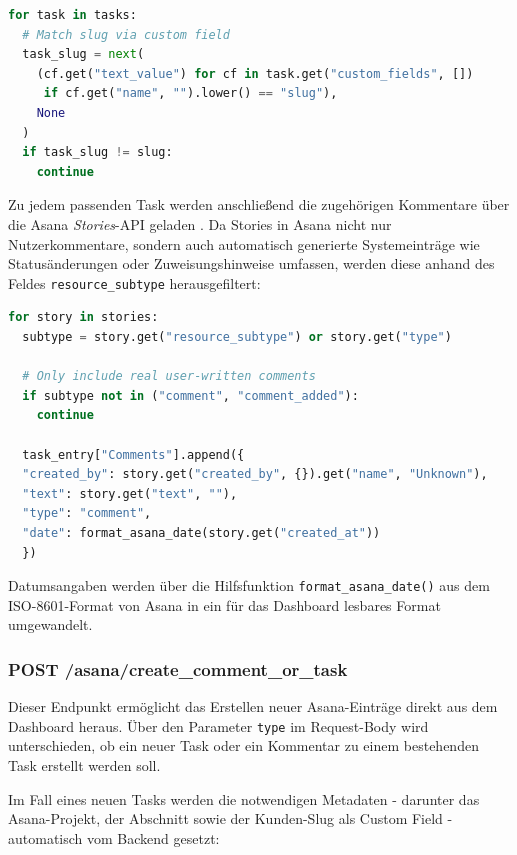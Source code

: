 \begin{lstlisting}[language=Python, caption={Filterung von Asana-Tasks nach Slug}, label={lst:asana-slug-filter}]
for task in tasks:
  # Match slug via custom field
  task_slug = next(
    (cf.get("text_value") for cf in task.get("custom_fields", [])
     if cf.get("name", "").lower() == "slug"),
    None
  )
  if task_slug != slug:
    continue
\end{lstlisting}

Zu jedem passenden Task werden anschließend die zugehörigen Kommentare über die Asana \textit{Stories}-API geladen \cite{asana_stories}. Da Stories in Asana nicht nur Nutzerkommentare, sondern auch automatisch generierte Systemeinträge wie Statusänderungen oder Zuweisungshinweise umfassen, werden diese anhand des Feldes \texttt{resource\_subtype} herausgefiltert:

\begin{lstlisting}[language=Python, caption={Filterung von Nutzerkommentaren aus Asana Stories}, label={lst:asana-stories-filter}]
for story in stories:
  subtype = story.get("resource_subtype") or story.get("type")

  # Only include real user-written comments
  if subtype not in ("comment", "comment_added"):
    continue

  task_entry["Comments"].append({
  "created_by": story.get("created_by", {}).get("name", "Unknown"),
  "text": story.get("text", ""),
  "type": "comment",
  "date": format_asana_date(story.get("created_at"))
  })
\end{lstlisting}

Datumsangaben werden über die Hilfsfunktion \texttt{format\_asana\_date()} aus dem ISO-8601-Format von Asana in ein für das Dashboard lesbares Format umgewandelt.

\subsubsection{POST /asana/create\_comment\_or\_task}
Dieser Endpunkt ermöglicht das Erstellen neuer Asana-Einträge direkt aus dem Dashboard heraus. Über den Parameter \texttt{type} im Request-Body wird unterschieden, ob ein neuer Task oder ein Kommentar zu einem bestehenden Task erstellt werden soll.

Im Fall eines neuen Tasks werden die notwendigen Metadaten - darunter das Asana-Projekt, der Abschnitt sowie der Kunden-Slug als Custom Field - automatisch vom Backend gesetzt:

